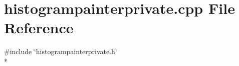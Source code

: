 \section{histogrampainterprivate.\+cpp File Reference}
\label{curve_2painters_2histogrampainterprivate_8cpp}
{\ttfamily \#include \char`\"{}histogrampainterprivate.\+h\char`\"{}}\\*
